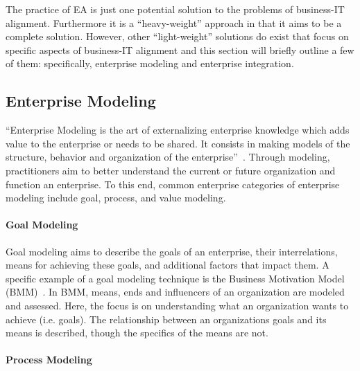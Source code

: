 The practice of EA is just one potential solution to the problems of business-IT alignment. Furthermore it is a ``heavy-weight'' approach in that it aims to be a complete solution. However, other ``light-weight'' solutions do exist that focus on specific aspects of business-IT alignment and this section will briefly outline a few of them: specifically, enterprise modeling and enterprise integration. 
  
\subsection{Enterprise Modeling}

``Enterprise Modeling is the art of externalizing enterprise knowledge which adds value to the enterprise or needs to be shared. It consists in making models of the structure, behavior and organization of the enterprise''~\cite{Vernadat200215}. Through modeling, practitioners aim to better understand the current or future organization and function an enterprise. To this end, common enterprise categories of enterprise modeling include goal, process, and value modeling. 

\paragraph*{Goal Modeling}

Goal modeling aims to describe the goals of an enterprise, their interrelations, means for achieving these goals, and additional factors that impact them. A specific example of a goal modeling technique is the Business Motivation Model (BMM)~\cite{bmm2010}. In BMM, means, ends and influencers of an organization are modeled and assessed. Here, the focus is on understanding what an organization wants to achieve (i.e. goals). The relationship between an organizations goals and its means is described, though the specifics of the means are not. 

\paragraph*{Process Modeling}

